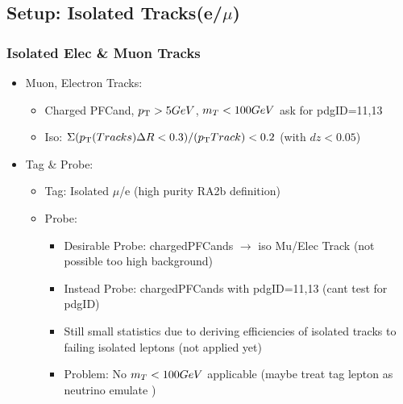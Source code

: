 \documentclass{beamer}
\begin{document}
\subsection{Setup: Isolated Tracks(e/$\mu$)}
\begin{frame}
 \frametitle{Isolated Elec \& Muon Tracks}
 \begin{itemize}
 \item Muon, Electron Tracks:
 \begin{itemize}
  \item Charged PFCand, $p_{\text{T}}>5 GeV$, $m_{T}<100 GeV$ ask for pdgID=11,13
  \item Iso: $\Sigma ( p_{\text{T}}\text(Tracks)\Delta R<0.3 )/(p_{\text{T}} Track) < 0.2$ (with $dz<0.05$)
 \end{itemize}
 \item Tag \& Probe:
 \begin{itemize}
  \item Tag: Isolated $\mu$/e (high purity RA2b definition)
  \item Probe:
 \begin{itemize}
  \item Desirable Probe: chargedPFCands $\rightarrow$ iso Mu/Elec Track (not possible too high background)
  \item Instead Probe: chargedPFCands with pdgID=11,13 (cant test for pdgID)
  \item Still small statistics due to deriving efficiencies of isolated tracks to failing isolated leptons (not applied yet)
  \item Problem: No $m_{T}<100 GeV$ applicable (maybe treat tag lepton as neutrino emulate \wtolnu)
 \end{itemize}
  \end{itemize}
 \end{itemize}
\end{frame}
\end{document}
